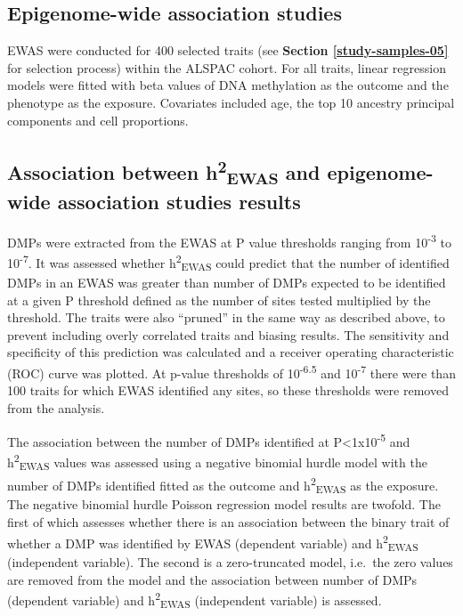 \documentclass[11pt,twoside]{bristolthesis}
\begin{document}
\hypertarget{methods-ewas-05}{%
\subsection{Epigenome-wide association studies}\label{methods-ewas-05}}

EWAS were conducted for 400 selected traits (see \textbf{Section \ref{study-samples-05}} for selection process) within the ALSPAC cohort. For all traits, linear regression models were fitted with beta values of DNA methylation as the outcome and the phenotype as the exposure. Covariates included age, the top 10 ancestry principal components and cell proportions.

\hypertarget{methods-h2ewas-dmp}{%
\subsection{\texorpdfstring{Association between h\textsuperscript{2}\textsubscript{EWAS} and epigenome-wide association studies results}{Association between h2EWAS and epigenome-wide association studies results}}\label{methods-h2ewas-dmp}}

DMPs were extracted from the EWAS at P value thresholds ranging from 10\textsuperscript{-3} to 10\textsuperscript{-7}. It was assessed whether h\textsuperscript{2}\textsubscript{EWAS} could predict that the number of identified DMPs in an EWAS was greater than number of DMPs expected to be identified at a given P threshold defined as the number of sites tested multiplied by the threshold. The traits were also ``pruned'' in the same way as described above, to prevent including overly correlated traits and biasing results. The sensitivity and specificity of this prediction was calculated and a receiver operating characteristic (ROC) curve was plotted. At p-value thresholds of 10\textsuperscript{-6.5} and 10\textsuperscript{-7} there were than 100 traits for which EWAS identified any sites, so these thresholds were removed from the analysis.

The association between the number of DMPs identified at P\textless1x10\textsuperscript{-5} and h\textsuperscript{2}\textsubscript{EWAS} values was assessed using a negative binomial hurdle model with the number of DMPs identified fitted as the outcome and h\textsuperscript{2}\textsubscript{EWAS} as the exposure. The negative binomial hurdle Poisson regression model results are twofold. The first of which assesses whether there is an association between the binary trait of whether a DMP was identified by EWAS (dependent variable) and h\textsuperscript{2}\textsubscript{EWAS} (independent variable). The second is a zero-truncated model, i.e.~the zero values are removed from the model and the association between number of DMPs (dependent variable) and h\textsuperscript{2}\textsubscript{EWAS} (independent variable) is assessed.
\end{document}
